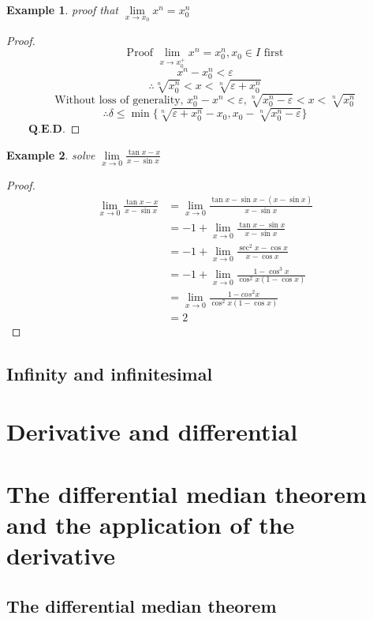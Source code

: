 \documentclass[a4paper,12pt]{report}
\newtheorem{example}{Example}[section]       %
\newtheorem*{proof}{Proof}    %
\begin{document}
\begin{example}
    proof that $\lim\limits_{x\rightarrow x_0}{x^n}=x_0^n$
\end{example}
\begin{proof}
    $$\text{Proof $\lim\limits_{x\rightarrow x_0^+}{x^n}=x_0^n,x_0\in I$ first}$$
    $$x^n-x_0^n<\varepsilon$$
    $$\therefore \sqrt[n]{x_0^n}<x<\sqrt[n]{\varepsilon+x_0^n}$$
    $$\text{Without loss of generality, }x_0^n-x^n<\varepsilon,\sqrt[n]{x_0^n-\varepsilon}<x<\sqrt[n]{x_0^n}$$
    $$\therefore \delta\leq\min\{\sqrt[n]{\varepsilon+x_0^n}-x_0,x_0-\sqrt[n]{x_0^n-\varepsilon}\}$$
    $\qquad\mathbf{Q.E.D.}$
\end{proof}
\begin{example}
    solve $\lim\limits_{x\rightarrow0}{\displaystyle\frac{\tan x-x}{x-\sin x}}$
\end{example}
\begin{proof}
$$\begin{aligned}
    \lim\limits_{x\rightarrow0}{\displaystyle\frac{\tan x-x}{x-\sin x}}&=\lim\limits_{x\rightarrow0}{\displaystyle\frac{\tan x-\sin x-(x-\sin x)}{x-\sin x}}\\
    &=-1+\lim\limits_{x\rightarrow0}{\displaystyle\frac{\tan x-\sin x}{x-\sin x}}\\
    &=-1+\lim\limits_{x\rightarrow0}{\displaystyle\frac{\sec^2x-\cos x}{x-\cos x}}\\
    &=-1+\lim\limits_{x\rightarrow0}{\displaystyle\frac{1-\cos^3x}{\cos^2x(1-\cos x)}}\\
    &=\lim\limits_{x\rightarrow0}{\displaystyle\frac{1-cos^2x}{\cos^2x(1-\cos x)}}\\
    &=2
\end{aligned}$$
\end{proof}
\subsection{Infinity and infinitesimal}

\section{Derivative and differential}
\section{The differential median theorem and the application of the derivative}
\subsection{The differential median theorem}
\end{document}
